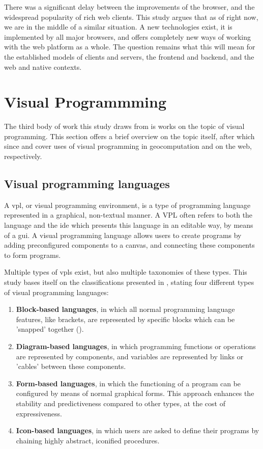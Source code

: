There was a significant delay between the improvements of the browser, and the widespread popularity of rich web clients. 
This study argues that as of right now, we are in the middle of a similar situation. 
A new technologies exist, it is implemented by all major browsers, and offers completely new ways of working with the web platform as a whole. 
The question remains what this will mean for the established models of clients and servers, the frontend and backend, and the web and native contexts. 

\section{Visual Programmming}
\label{sec:background-vpl}

The third body of work this study draws from is works on the topic of visual programming. 
This section offers a brief overview on the topic itself, after which since  and  cover uses of visual programming in geocomputation and on the web, respectively. 

\subsection*{Visual programming languages}

A \ac{vpl}, or visual programming environment, is a type of programming language represented in a graphical, non-textual manner.
A VPL often refers to both the language and the \ac{ide} which presents this language in an editable way, by means of a \ac{gui}.
A visual programming language allows users to create programs by adding preconfigured components to a canvas, and connecting these components to form programs. 

Multiple types of \ac{vpl}s exist, but also multiple taxonomies of these types.
This study bases itself on the classifications presented in \cite{kuhail_characterizing_2021}, stating four different types of visual programming languages: 
\begin{enumerate}
  \item \textbf{Block-based languages}, in which all normal programming language features, like brackets, are represented by specific blocks which can be 'snapped' together (\label{fig:sidebyside:1}).
  \item \textbf{Diagram-based languages}, in which programming functions or operations are represented by components, and variables are represented by links or 'cables' between these components.  
  \item \textbf{Form-based languages}, in which the functioning of a program can be configured by means of normal graphical forms. 
  This approach enhances the stability and predictiveness compared to other types, at the cost of expressiveness.
  \item \textbf{Icon-based languages}, in which users are asked to define their programs by chaining highly abstract, iconified procedures. 
\end{enumerate}

